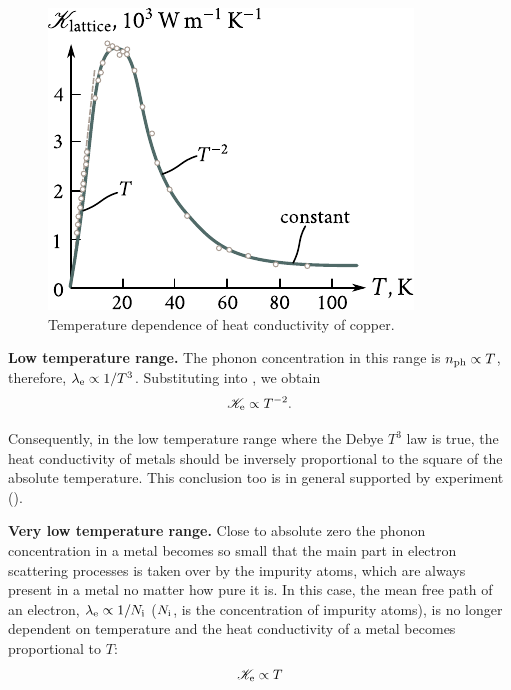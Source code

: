 \begin{figure}[t]
	\begin{center}
		\includegraphics[scale=1]{figures/ch_04/fig_4_10.pdf}
		\caption[]{Temperature dependence of heat conductivity of copper.}
		\label{fig:4_10}
	\end{center}
	\vspace{-0.7cm}
\end{figure}

\textbf{Low temperature range.} The phonon concentration in this range is $n_{\text{ph}}\propto T$, therefore, $\lambda_{\text{e}}\propto 1/T^3$. Substituting into , we obtain
\begin{equation}\label{eq:4_60}
    \mathscr{K}_{\text{e}} \propto T^{-2}.
\end{equation}

Consequently, in the low temperature range where the Debye $T^3$ law is true, the heat conductivity of metals should be inversely proportional to the square of the absolute temperature. This conclusion too is in general supported by experiment ().

\textbf{Very low temperature range.} Close to absolute zero the phonon concentration in a metal becomes so small that the main part in electron scattering processes is taken over by the impurity atoms, which are always present in a metal no matter how pure it is. In this case, the mean free path of an electron, $\lambda_{\text{e}}\propto 1/N_{\text{i}}$ ($N_{\text{i}}$, is the concentration of impurity atoms), is no longer dependent on temperature and the heat conductivity of a metal becomes proportional to $T$:
\begin{equation}\label{eq:4_61}
    \mathscr{K}_{\text{e}} \propto T
\end{equation}

